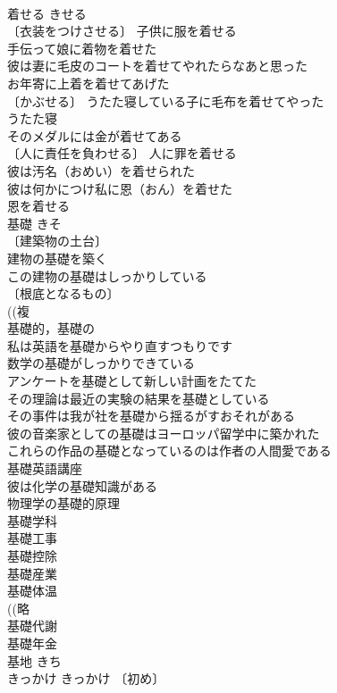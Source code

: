 \documentclass[8pt]{extreport}
\begin{document}
\begin{CJK}{UTF8}{min}
\\	着せる	きせる	
\\	〔衣装をつけさせる〕 子供に服を着せる 
\\	手伝って娘に着物を着せた 
\\	彼は妻に毛皮のコートを着せてやれたらなあと思った 
\\	お年寄に上着を着せてあげた 
\\	〔かぶせる〕 うたた寝している子に毛布を着せてやった 
\\	うたた寝　
\\	そのメダルには金が着せてある 
\\	〔人に責任を負わせる〕 人に罪を着せる 
\\	彼は汚名（おめい）を着せられた 
\\	彼は何かにつけ私に恩（おん）を着せた 
\\	恩を着せる 
\\	基礎	きそ	
\\	〔建築物の土台〕
\\	建物の基礎を築く 
\\	この建物の基礎はしっかりしている 
\\	〔根底となるもの〕
\\	((複
\\	基礎的，基礎の 
\\	私は英語を基礎からやり直すつもりです 
\\	数学の基礎がしっかりできている 
\\	アンケートを基礎として新しい計画をたてた 
\\	その理論は最近の実験の結果を基礎としている 
\\	その事件は我が社を基礎から揺るがすおそれがある 
\\	彼の音楽家としての基礎はヨーロッパ留学中に築かれた 
\\	これらの作品の基礎となっているのは作者の人間愛である 
\\	基礎英語講座 
\\	彼は化学の基礎知識がある 
\\	物理学の基礎的原理 
\\	基礎学科 
\\	基礎工事 
\\	基礎控除 
\\	基礎産業 
\\	基礎体温 
\\	((略
\\	基礎代謝 
\\	基礎年金 
\\	基地	きち	
\\	きっかけ	きっかけ	〔初め〕

\end{CJK}
\end{document}
